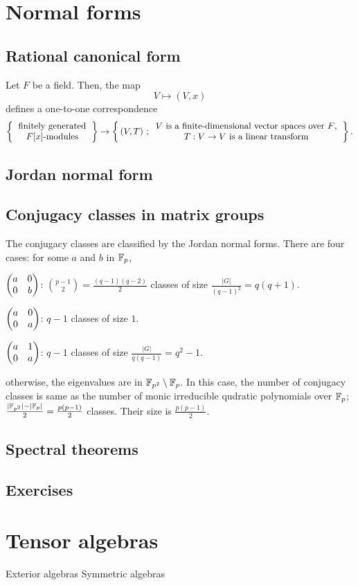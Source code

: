 \documentclass{../../large}
\begin{document}
\chapter{Normal forms}
\section{Rational canonical form}
\begin{prb}
Let $F$ be a field.
Then, the map
\[V\mapsto(V,x)\]
defines a one-to-one correspondence
\[\left\{\begin{tabular}{c}finitely generated\\$F[x]$-modules\end{tabular}\right\}\to\left\{\,(V,T)\ ;\begin{tabular}{c}$V$ is a finite-dimensional vector spaces over $F$,\\$T:V\to V$ is a linear transform\end{tabular}\right\}.\]
\end{prb}
\begin{prb}
\end{prb}
\section{Jordan normal form}


\section{Conjugacy classes in matrix groups}

\begin{prb}
The conjugacy classes are classified by the Jordan normal forms.
There are four cases: for some $a$ and $b$ in $\mathbb{F}_p$,
\begin{parts}
\item $\begin{pmatrix}a&0\\0&b\end{pmatrix}$: $\binom{p-1}2=\frac{(q-1)(q-2)}2$ classes of size $\frac{|G|}{(q-1)^2}=q(q+1)$.
\item $\begin{pmatrix}a&0\\0&a\end{pmatrix}$: $q-1$ classes of size $1$.
\item $\begin{pmatrix}a&1\\0&a\end{pmatrix}$: $q-1$ classes of size $\frac{|G|}{q(q-1)}=q^2-1$.
\item otherwise, the eigenvalues are in $\mathbb{F}_{p^2}\setminus\mathbb{F}_p$.
In this case, the number of conjugacy classes is same as the number of monic irreducible qudratic polynomials over $\mathbb{F}_p$; $\frac{|\mathbb{F}_{p^2}|-|\mathbb{F}_p|}2=\frac{p(p-1)}2$ classes.
Their size is $\frac{p(p-1)}2$.
\end{parts}
\end{prb}

\section{Spectral theorems}



\section*{Exercises}




\chapter{Tensor algebras}
Exterior algebras
Symmetric algebras
\end{document}
